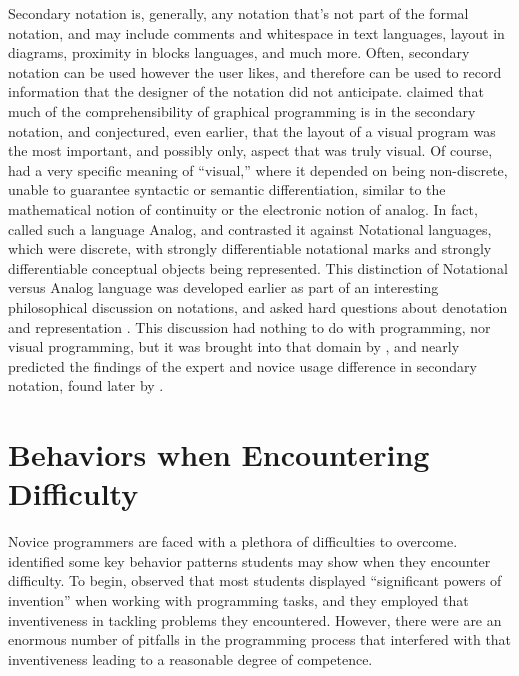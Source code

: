 Secondary notation is, generally, any notation that's not part of the formal notation, and may include comments and whitespace in text languages, layout in diagrams, proximity in blocks languages, and much more. Often, secondary notation can be used however the user likes, and therefore can be used to record information that the designer of the notation did not anticipate. \citet{petre-1995} claimed that much of the comprehensibility of graphical programming is in the secondary notation, and \citet{raymond-1991} conjectured, even earlier, that the layout of a visual program was the most important, and possibly only, aspect that was truly visual. Of course, \citeauthor{raymond-1991} had a very specific meaning of ``visual,'' where it depended on being non-discrete, unable to guarantee syntactic or semantic differentiation, similar to the mathematical notion of continuity or the electronic notion of analog. In fact, \citeauthor{raymond-1991} called such a language Analog, and contrasted it against Notational languages, which were discrete, with strongly differentiable notational marks and strongly differentiable conceptual objects being represented. This distinction of Notational versus Analog language was developed earlier as part of an interesting philosophical discussion on notations, and asked hard questions about denotation and representation \citep{goodman-1976}. This discussion had nothing to do with programming, nor visual programming, but it was brought into that domain by \citeauthor{raymond-1991}, and nearly predicted the findings of the expert and novice usage difference in secondary notation, found later by \citet{petre-2006}.



\section{Behaviors when Encountering Difficulty}
\label{sec:behaviors}
Novice programmers are faced with a plethora of difficulties to overcome. \citet{perkins-1986} identified some key behavior patterns students may show when they encounter difficulty. To begin, \citeauthor{perkins-1986} observed that most students displayed ``significant powers of invention'' when working with programming tasks, and they employed that inventiveness in tackling problems they encountered. However, there were are an enormous number of pitfalls in the programming process that interfered with that inventiveness leading to a reasonable degree of competence. 

